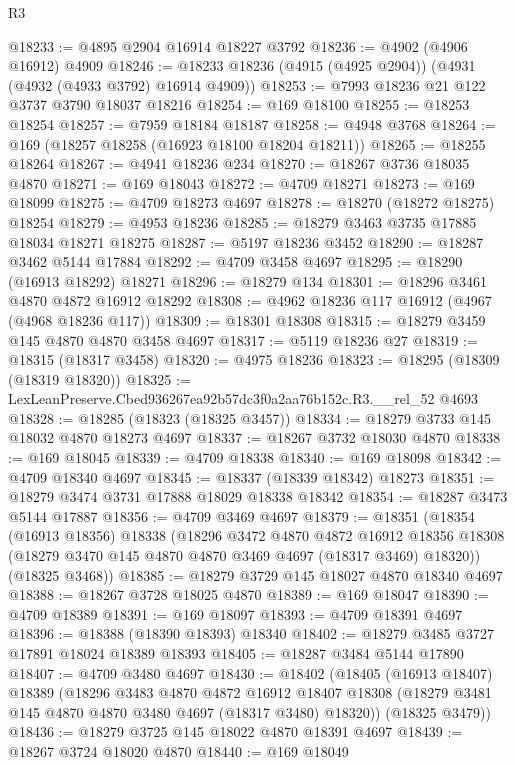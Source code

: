 \begin{lexlean}{R3}
\begin{coremodule}
@18233 := @4895 @2904 @16914 @18227 @3792
@18236 := @4902 (@4906 @16912) @4909
@18246 := @18233 @18236 (@4915 (@4925 @2904)) (@4931 (@4932 (@4933 @3792) @16914 @4909))
@18253 := @7993 @18236 @21 @122 @3737 @3790 @18037 @18216
@18254 := @169 @18100
@18255 := @18253 @18254
@18257 := @7959 @18184 @18187
@18258 := @4948 @3768
@18264 := @169 (@18257 @18258 (@16923 @18100 @18204 @18211))
@18265 := @18255 @18264
@18267 := @4941 @18236 @234
@18270 := @18267 @3736 @18035 @4870
@18271 := @169 @18043
@18272 := @4709 @18271
@18273 := @169 @18099
@18275 := @4709 @18273 @4697
@18278 := @18270 (@18272 @18275) @18254
@18279 := @4953 @18236
@18285 := @18279 @3463 @3735 @17885 @18034 @18271 @18275
@18287 := @5197 @18236 @3452
@18290 := @18287 @3462 @5144 @17884
@18292 := @4709 @3458 @4697
@18295 := @18290 (@16913 @18292) @18271
@18296 := @18279 @134
@18301 := @18296 @3461 @4870 @4872 @16912 @18292
@18308 := @4962 @18236 @117 @16912 (@4967 (@4968 @18236 @117))
@18309 := @18301 @18308
@18315 := @18279 @3459 @145 @4870 @4870 @3458 @4697
@18317 := @5119 @18236 @27
@18319 := @18315 (@18317 @3458)
@18320 := @4975 @18236
@18323 := @18295 (@18309 (@18319 @18320))
@18325 := LexLeanPreserve.Cbed936267ea92b57dc3f0a2aa76b152c.R3.__rel_52 @4693
@18328 := @18285 (@18323 (@18325 @3457))
@18334 := @18279 @3733 @145 @18032 @4870 @18273 @4697
@18337 := @18267 @3732 @18030 @4870
@18338 := @169 @18045
@18339 := @4709 @18338
@18340 := @169 @18098
@18342 := @4709 @18340 @4697
@18345 := @18337 (@18339 @18342) @18273
@18351 := @18279 @3474 @3731 @17888 @18029 @18338 @18342
@18354 := @18287 @3473 @5144 @17887
@18356 := @4709 @3469 @4697
@18379 := @18351
    (@18354
      (@16913 @18356)
      @18338
      (@18296
        @3472
        @4870
        @4872
        @16912
        @18356
        @18308
        (@18279 @3470 @145 @4870 @4870 @3469 @4697 (@18317 @3469) @18320))
      (@18325 @3468))
@18385 := @18279 @3729 @145 @18027 @4870 @18340 @4697
@18388 := @18267 @3728 @18025 @4870
@18389 := @169 @18047
@18390 := @4709 @18389
@18391 := @169 @18097
@18393 := @4709 @18391 @4697
@18396 := @18388 (@18390 @18393) @18340
@18402 := @18279 @3485 @3727 @17891 @18024 @18389 @18393
@18405 := @18287 @3484 @5144 @17890
@18407 := @4709 @3480 @4697
@18430 := @18402
    (@18405
      (@16913 @18407)
      @18389
      (@18296
        @3483
        @4870
        @4872
        @16912
        @18407
        @18308
        (@18279 @3481 @145 @4870 @4870 @3480 @4697 (@18317 @3480) @18320))
      (@18325 @3479))
@18436 := @18279 @3725 @145 @18022 @4870 @18391 @4697
@18439 := @18267 @3724 @18020 @4870
@18440 := @169 @18049

\end{coremodule}
\end{lexlean}
